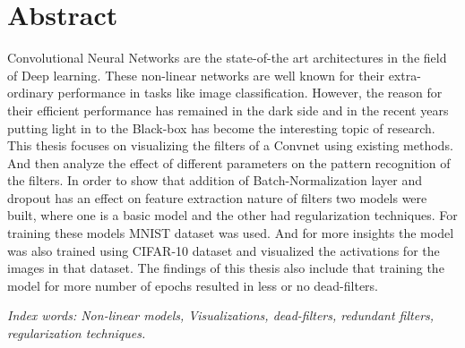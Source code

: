 \chapter*{Abstract}
Convolutional Neural Networks are the state-of-the art architectures in the field of Deep learning. These non-linear networks are well known for their extra-ordinary performance in tasks like image classification. However, the reason for their efficient performance has remained in the dark side and in the recent years putting light in to the Black-box has become the interesting topic of research. This thesis focuses on visualizing the filters of a Convnet using existing methods. And then analyze the effect of different parameters on the pattern recognition of the filters. In order to show that addition of Batch-Normalization layer and dropout has an effect on feature extraction nature of filters two models were built, where one is a basic model and the other had regularization techniques. For training these models MNIST dataset was used. And for more insights the model was also trained using CIFAR-10 dataset and visualized the activations for the images in that dataset. The findings of this thesis also include that training the model for more number of epochs resulted in less or no dead-filters. 

\textit{Index words: Non-linear models, Visualizations, dead-filters, redundant filters, regularization techniques.}